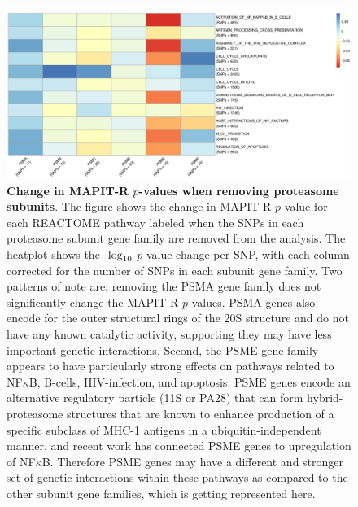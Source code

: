\documentclass[12pt,a4paper]{article}
\def\log{{\rm log}}
\begin{document}
\begin{figure}[]
\centering
\includegraphics[scale=.45]{Images/Main/InterPath_Main_Figure_Proteasome_vs1.png}
\caption[TBD]{\textbf{Change in MAPIT-R $p$-values when removing proteasome subunits}. The figure shows the change in MAPIT-R $p$-value for each REACTOME pathway labeled when the SNPs in each proteasome subunit gene family are removed from the analysis. The heatplot shows the -$\log_{10}$ $p$-value change per SNP, with each column corrected for the number of SNPs in each subunit gene family. Two patterns of note are: removing the PSMA gene family does not significantly change the MAPIT-R $p$-values. PSMA genes also encode for the outer structural rings of the 20S structure and do not have any known catalytic activity, supporting they may have less important genetic interactions. Second, the PSME gene family appears to have particularly strong effects on pathways related to NF$\kappa$B, B-cells, HIV-infection, and apoptosis. PSME genes encode an alternative regulatory particle (11S or PA28) that can form hybrid-proteasome structures that are known to enhance production of a specific subclass of MHC-1 antigens in a ubiquitin-independent manner, and recent work has connected PSME genes to upregulation of NF$\kappa$B. Therefore PSME genes may have a different and stronger set of genetic interactions within these pathways as compared to the other subunit gene families, which is getting represented here.
}
\label{InterPath-Main-Figure-Proteasome-Heatplot}
\end{figure}

\fi
\end{document}
